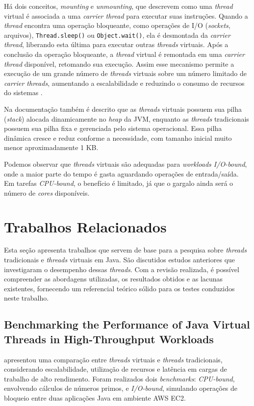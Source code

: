 \documentclass[12pt, openright, oneside, a4paper, english,	french,	spanish, brazil	]{abntex2}
\begin{document}
    Há dois conceitos, \textit{mounting} e \textit{unmounting}, que descrevem como uma \textit{thread} virtual é associada a uma \textit{carrier thread} para executar suas instruções. Quando a \textit{thread} encontra uma operação bloqueante, como operações de I/O (\textit{sockets}, arquivos), \texttt{Thread.sleep()} ou \texttt{Object.wait()}, ela é desmontada da \textit{carrier thread}, liberando esta última para executar outras \textit{threads} virtuais. Após a conclusão da operação bloqueante, a \textit{thread} virtual é remontada em uma \textit{carrier thread} disponível, retomando sua execução. Assim esse mecanismo permite a execução de um grande número de \textit{threads} virtuais sobre um número limitado de \textit{carrier threads}, aumentando a escalabilidade e reduzindo o consumo de recursos do sistemas .

    Na documentação  também é descrito que as \textit{threads} virtuais possuem sua pilha (\textit{stack}) alocada dinamicamente no \textit{heap} da JVM, enquanto as \textit{threads} tradicionais possuem sua pilha fixa e gerenciada pelo sistema operacional. Essa pilha dinâmica cresce e reduz conforme a necessidade, com tamanho inicial muito menor aproximadamente 1 KB.

    Podemos observar que \textit{threads} virtuais são adequadas para \textit{workloads I/O-bound}, onde a maior parte do tempo é gasta aguardando operações de entrada/saída. Em tarefas \textit{CPU-bound}, o benefício é limitado, já que o gargalo ainda será o número de \textit{cores} disponíveis.

    \chapter{Trabalhos Relacionados}
    \label{chapter:trabalhos}

    Esta seção apresenta trabalhos que servem de base para a pesquisa sobre \textit{threads} tradicionais e \textit{threads} virtuais em Java. São discutidos estudos anteriores que investigaram o desempenho dessas \textit{threads}. Com a revisão realizada, é possível compreender as abordagens utilizadas, os resultados obtidos e as lacunas existentes, fornecendo um referencial teórico sólido para os testes conduzidos neste trabalho.

    \section{Benchmarking the Performance of Java Virtual Threads in High-Throughput Workloads}
         apresentou uma comparação entre \textit{threads} virtuais e \textit{threads} tradicionais, considerando escalabilidade, utilização de recursos e latência em cargas de trabalho de alto rendimento. Foram realizados dois \textit{benchmarks}: \textit{CPU-bound}, envolvendo cálculos de números primos, e \textit{I/O-bound}, simulando operações de bloqueio entre duas aplicações Java em ambiente AWS EC2.
\end{document}
